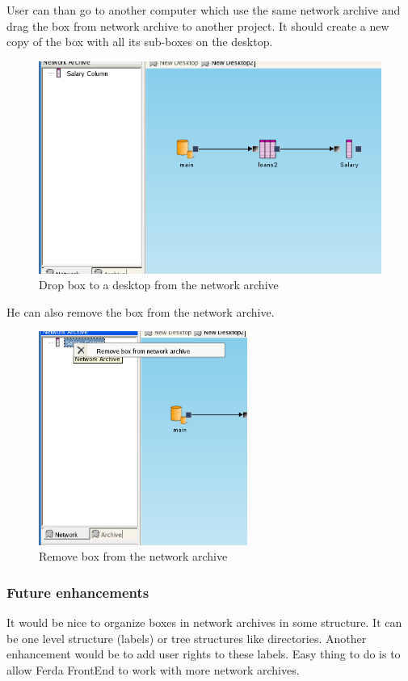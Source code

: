 \documentclass[a4paper,12pt]{book}
\begin{document}
User can than go to another computer which use the same network archive and drag the box from network archive to another project. It should create a new copy of the box with all its sub-boxes on the desktop.
\begin{figure}
	\includegraphics[width=13.72cm]{network_archive_drop_to_desktop}
	\caption{Drop box to a desktop from the network archive}
\end{figure}
He can also remove the box from the network archive.
\begin{figure}
	\includegraphics[height=7cm]{network_archive_remove_box}
	\caption{Remove box from the network archive}
\end{figure}

\subsubsection{Future enhancements}
It would be nice to organize boxes in network archives in some structure. It can be one level structure (labels) or tree structures like directories. Another enhancement would be to add user rights to these labels. Easy thing to do is to allow Ferda FrontEnd to work with more network archives.
\end{document}
